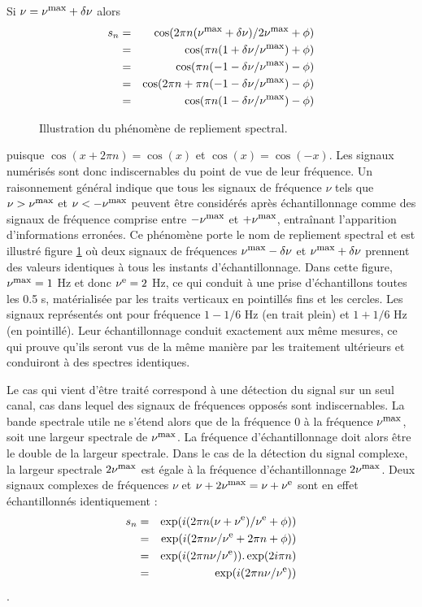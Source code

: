 Si $\nu = \nu^{\mbox{\footnotesize{max}}} + \delta\nu$ alors
\begin{eqnarray}
s_n & = & \cos(2\pi n (\nu^{\mbox{\footnotesize{max}}} + \delta\nu)/2\nu^{\mbox{\footnotesize{max}}} + \phi) \\
& = & \cos(\pi n(1+\delta\nu/\nu^{\mbox{\footnotesize{max}}}) + \phi) \\
& = & \cos(\pi n(-1-\delta\nu/\nu^{\mbox{\footnotesize{max}}}) - \phi) \\
& = & \cos(2\pi n + \pi n(-1-\delta\nu/\nu^{\mbox{\footnotesize{max}}}) - \phi) \\
& = & \cos(\pi n(1-\delta\nu/\nu^{\mbox{\footnotesize{max}}}) - \phi)
\end{eqnarray}

\begin{figure}[hbt]
\begin{center}
\end{center}
\caption{Illustration du phénomène de repliement spectral.}
\label{fig:aliasing}
\end{figure}

puisque $\cos(x+2\pi n) = \cos(x)$ et $\cos(x) = \cos(-x)$.
Les signaux numérisés sont donc indiscernables du point de vue de leur fréquence.
Un raisonnement général indique que tous les signaux de
fréquence $\nu$ tels que $\nu > \nu^{\mbox{\footnotesize{max}}}$ et $\nu < -\nu^{\mbox{\footnotesize{max}}}$ peuvent être considérés
après échantillonnage comme des signaux de fréquence comprise entre $-\nu^{\mbox{\footnotesize{max}}}$ et $+\nu^{\mbox{\footnotesize{max}}}$,
entraînant l'apparition d'informations erronées.
Ce phénomène porte le nom de
repliement spectral et est illustré figure \ref{fig:aliasing} 
où deux signaux de fréquences $\nu^{\mbox{\footnotesize{max}}} - \delta\nu$ et
$\nu^{\mbox{\footnotesize{max}}} + \delta\nu$ prennent des valeurs identiques à tous les instants d'échantillonnage.
Dans cette figure, $\nu^{\mbox{\footnotesize{max}}} = 1$ Hz et donc $\nu^{\mbox{\footnotesize{e}}} = 2$ Hz, ce qui conduit à une
prise d'échantillons toutes les 0.5 s, matérialisée par les traits verticaux en pointillés fins
et les cercles.
Les signaux  représentés ont pour fréquence $1 - 1/6$ Hz (en trait plein) et
$1 + 1/6$ Hz (en pointillé). Leur échantillonnage conduit exactement
aux même mesures, ce qui prouve qu'ils seront vus de la même manière par
les traitement ultérieurs et conduiront à des spectres identiques.

Le cas qui vient d'être traité correspond à une détection du signal sur un seul canal,
cas dans lequel des signaux de fréquences opposés sont indiscernables.
La bande spectrale utile ne s'étend alors que de la fréquence 0 à la fréquence $\nu^{\mbox{\footnotesize{max}}}$,
soit une largeur spectrale de $\nu^{\mbox{\footnotesize{max}}}$.
La fréquence d'échantillonnage doit alors être le double de la largeur spectrale.
Dans le cas de la détection du signal complexe, la largeur spectrale $2\nu^{\mbox{\footnotesize{max}}}$ est égale
à la fréquence d'échantillonnage $2\nu^{\mbox{\footnotesize{max}}}$.
Deux signaux complexes de fréquences $\nu$ et $\nu+2\nu^{\mbox{\footnotesize{max}}} = \nu+\nu^{\mbox{\footnotesize{e}}}$ sont 
en effet échantillonnés identiquement :
\begin{eqnarray}
s_n & = & \exp(i(2 \pi n (\nu + \nu^{\mbox{\footnotesize{e}}})/\nu^{\mbox{\footnotesize{e}}} + \phi)) \\
& = & \exp(i(2 \pi n \nu/\nu^{\mbox{\footnotesize{e}}} + 2 \pi n + \phi)) \\
& = & \exp(i(2 \pi n \nu/\nu^{\mbox{\footnotesize{e}}})).\exp(2 i \pi n) \\
& = & \exp(i(2 \pi n \nu/\nu^{\mbox{\footnotesize{e}}}))
\end{eqnarray}.

